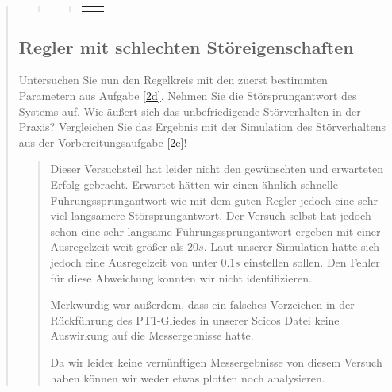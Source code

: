 \begin{quote}
\begin{quote}
\begin{quote}
\begin{center}
\begin{tabular}{ll}
\begin{minipage}{0.6\textwidth}
            \end{minipage}
            
        \end{tabular}
        \end{center}
        \end{quote}
        
        
        
        
        
        
        
    \end{quote}
    
    
    \subsection{Regler mit schlechten Störeigenschaften}
    Untersuchen Sie nun den Regelkreis mit den zuerst bestimmten Parametern aus Aufgabe
    \ref{2d}. Nehmen Sie die Störsprungantwort des Systems auf. Wie äußert sich das unbefriedigende Störverhalten in der Praxis?
    Vergleichen Sie das Ergebnis mit der Simulation des Störverhaltens aus der Vorbereitungsaufgabe \ref{2e}!
    
    \begin{quote}
        
        Dieser Versuchsteil hat leider nicht den gewünschten und erwarteten Erfolg gebracht. Erwartet hätten wir einen
        ähnlich schnelle Führungssprungantwort wie mit dem guten Regler jedoch eine sehr viel langsamere
        Störsprungantwort. Der Versuch selbst hat jedoch schon eine sehr langsame Führungssprungantwort ergeben mit
        einer Ausregelzeit weit größer als $20 s$. Laut unserer Simulation hätte sich jedoch eine Ausregelzeit von unter
        $0.1 s$ einstellen sollen. Den Fehler für diese Abweichung konnten wir nicht identifizieren.\vspace{1em}
        
        Merkwürdig war außerdem, dass ein falsches Vorzeichen in der Rückführung des PT1-Gliedes in unserer Scicos Datei
        keine Auswirkung auf die Messergebnisse hatte.\vspace{1em}
        
        Da wir leider keine vernünftigen Messergebnisse von diesem Versuch haben können wir weder etwas plotten noch
        analysieren.
        
        
    \end{quote}
    
    

\end{quote}

